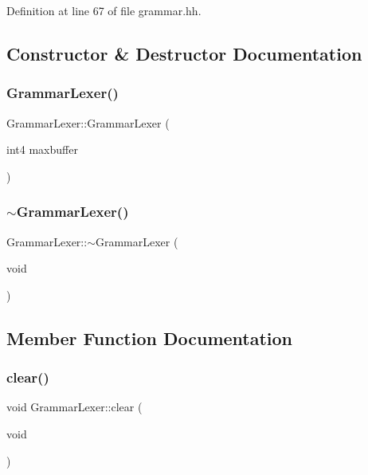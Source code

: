 Definition at line 67 of file grammar.\+hh.



\subsection{Constructor \& Destructor Documentation}
\mbox{\label{class_grammar_lexer_a9232da982dd036a4faea857e56a11bdf}} 
\subsubsection{\texorpdfstring{GrammarLexer()}{GrammarLexer()}}
{\footnotesize\ttfamily Grammar\+Lexer\+::\+Grammar\+Lexer (\begin{DoxyParamCaption}\item[{int4}]{maxbuffer }\end{DoxyParamCaption})}

\mbox{\label{class_grammar_lexer_a9201b664f6f62710050d71e110f354b7}} 
\subsubsection{\texorpdfstring{$\sim$GrammarLexer()}{~GrammarLexer()}}
{\footnotesize\ttfamily Grammar\+Lexer\+::$\sim$\+Grammar\+Lexer (\begin{DoxyParamCaption}\item[{void}]{ }\end{DoxyParamCaption})}



\subsection{Member Function Documentation}
\mbox{\label{class_grammar_lexer_a504d1049d783129cbcf0200eec46c48b}} 
\subsubsection{\texorpdfstring{clear()}{clear()}}
{\footnotesize\ttfamily void Grammar\+Lexer\+::clear (\begin{DoxyParamCaption}\item[{void}]{ }\end{DoxyParamCaption})}


